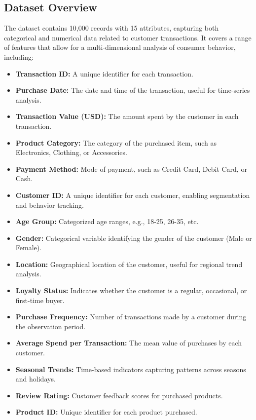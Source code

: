 \documentclass[12pt, a4paper,twoside]{report}
\theoremstyle{plain} %
\theoremstyle{definition} %
\theoremstyle{remark} %
\numberwithin{equation}{chapter}
\begin{document}
\subsection{Dataset Overview}
The dataset contains 10,000 records with 15 attributes, capturing both categorical and numerical data related to customer transactions. It covers a range of features that allow for a multi-dimensional analysis of consumer behavior, including:

\begin{itemize}
\item \textbf{Transaction ID:} A unique identifier for each transaction.
\item \textbf{Purchase Date:} The date and time of the transaction, useful for time-series analysis.
\item \textbf{Transaction Value (USD):} The amount spent by the customer in each transaction.
\item \textbf{Product Category:} The category of the purchased item, such as Electronics, Clothing, or Accessories.
\item \textbf{Payment Method:} Mode of payment, such as Credit Card, Debit Card, or Cash.
\item \textbf{Customer ID:} A unique identifier for each customer, enabling segmentation and behavior tracking.
\item \textbf{Age Group:} Categorized age ranges, e.g., 18-25, 26-35, etc.
\item \textbf{Gender:} Categorical variable identifying the gender of the customer (Male or Female).
\item \textbf{Location:} Geographical location of the customer, useful for regional trend analysis.
\item \textbf{Loyalty Status:} Indicates whether the customer is a regular, occasional, or first-time buyer.
\item \textbf{Purchase Frequency:} Number of transactions made by a customer during the observation period.
\item \textbf{Average Spend per Transaction:} The mean value of purchases by each customer.
\item \textbf{Seasonal Trends:} Time-based indicators capturing patterns across seasons and holidays.
\item \textbf{Review Rating:} Customer feedback scores for purchased products.
\item \textbf{Product ID:} Unique identifier for each product purchased.
\end{itemize}
\end{document}
